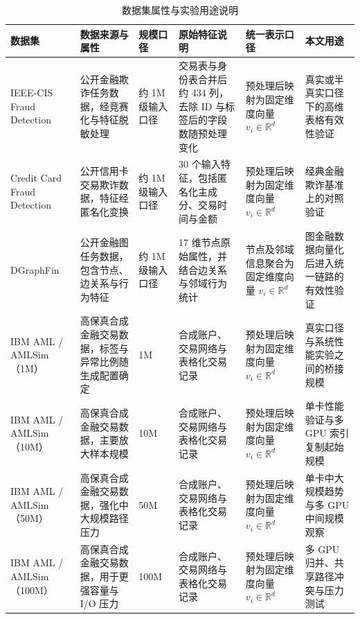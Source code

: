 \begin{table}[htbp]
  \caption{数据集属性与实验用途说明}
  \label{tab:dataset-stats-usage}
  \centering
  \footnotesize
  \setlength{\tabcolsep}{2.0pt}
  \renewcommand{\arraystretch}{1.18}
  \begin{adjustbox}{max width=\linewidth}
  \begin{tabular}{P{2.45cm}P{3.1cm}P{1.75cm}P{3.3cm}P{3.0cm}P{3.4cm}}
    \toprule
    数据集 & 数据来源与属性 & 规模口径 & 原始特征说明 & 统一表示口径 & 本文用途\\
    \midrule
    IEEE-CIS Fraud Detection & 公开金融欺诈任务数据，经竞赛化与特征脱敏处理 & 约 1M 级输入口径 & 交易表与身份表合并后约 434 列，去除 ID 与标签后的字段数随预处理变化 & 预处理后映射为固定维度向量 $v_i\in\mathbb{R}^{d}$ & 真实或半真实口径下的高维表格有效性验证\\
    Credit Card Fraud Detection & 公开信用卡交易欺诈数据，特征经匿名化变换 & 约 1M 级输入口径 & 30 个输入特征，包括匿名化主成分、交易时间与金额 & 预处理后映射为固定维度向量 $v_i\in\mathbb{R}^{d}$ & 经典金融欺诈基准上的对照验证\\
    DGraphFin & 公开金融图任务数据，包含节点、边关系与行为特征 & 约 1M 级输入口径 & 17 维节点原始属性，并结合边关系与邻域行为统计 & 节点及邻域信息聚合为固定维度向量 $v_i\in\mathbb{R}^{d}$ & 图金融数据向量化后进入统一链路的有效性验证\\
    IBM AML / AMLSim（1M） & 高保真合成金融交易数据，标签与异常比例随生成配置确定 & 1M & 合成账户、交易网络与表格化交易记录 & 预处理后映射为固定维度向量 $v_i\in\mathbb{R}^{d}$ & 真实口径与系统性能实验之间的桥接规模\\
    IBM AML / AMLSim（10M） & 高保真合成金融交易数据，主要放大样本规模 & 10M & 合成账户、交易网络与表格化交易记录 & 预处理后映射为固定维度向量 $v_i\in\mathbb{R}^{d}$ & 单卡性能验证与多 GPU 索引复制起始规模\\
    IBM AML / AMLSim（50M） & 高保真合成金融交易数据，强化中大规模路径压力 & 50M & 合成账户、交易网络与表格化交易记录 & 预处理后映射为固定维度向量 $v_i\in\mathbb{R}^{d}$ & 单卡中大规模趋势与多 GPU 中间规模观察\\
    IBM AML / AMLSim（100M） & 高保真合成金融交易数据，用于更强容量与 I/O 压力 & 100M & 合成账户、交易网络与表格化交易记录 & 预处理后映射为固定维度向量 $v_i\in\mathbb{R}^{d}$ & 多 GPU 归并、共享路径冲突与压力测试\\
    \bottomrule
  \end{tabular}
  \end{adjustbox}
\end{table}

